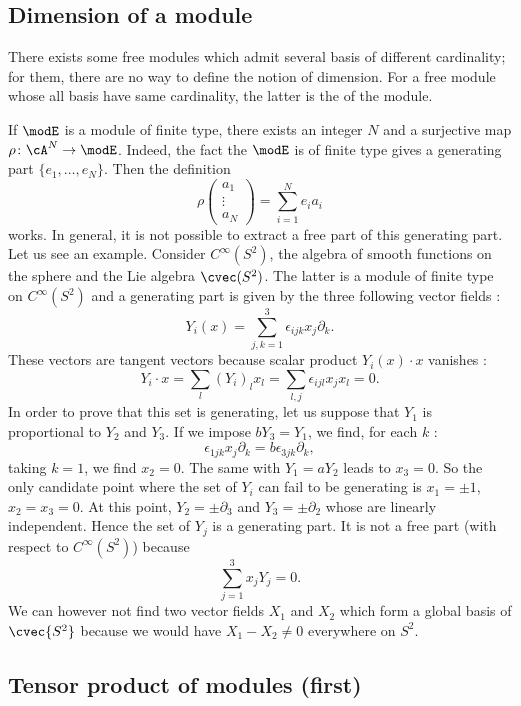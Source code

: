 \subsection{Dimension of a module} \label{subsec_DimofModule}

There exists some free modules which admit several basis of different cardinality; for them, there are no way to define the notion of dimension. For a free module whose all basis have same cardinality, the latter is the  of the module.

If $\modE$ is a module of finite type, there exists an integer $N$ and a surjective map $\rho\colon \cA^N\to \modE$. Indeed, the fact the $\modE$ is of finite type gives a generating part $\{ e_1,\ldots,e_N \}$. Then the definition
\[ 
  \rho
\begin{pmatrix}
a_1\\\vdots\\ a_N
\end{pmatrix}
=
\sum_{i=1}^N e_ia_i
\]
works. In general, it is not possible to extract a free part of this generating part. Let us see an example. Consider $ C^{\infty}(S^2)$, the algebra of smooth functions on the sphere and the Lie algebra $\cvec(S^2)$. The latter is a module of finite type on $ C^{\infty}(S^2)$ and a generating part is given by the three following vector fields :
\[ 
  Y_i(x)=\sum_{j,k=1}^3 \epsilon_{ijk}x_j\partial_k.
\]
These vectors are tangent vectors because scalar product $Y_i(x)\cdot x$ vanishes :
\[ 
  Y_i\cdot x =\sum_l (Y_i)_lx_l=\sum_{l,j}\epsilon_{ijl} x_jx_l=0.
\]
In order to prove that this set is generating, let us suppose that $Y_1$ is proportional to $Y_2$ and $Y_3$. If we impose $bY_3=Y_1$, we find, for each $k$ :
\[ 
  \epsilon_{1jk} x_j\partial_k=b\epsilon_{3jk}\partial_k,
\]
taking $k=1$, we find $x_2=0$. The same with $Y_1=aY_2$ leads to $x_3=0$. So the only candidate point where the set of $Y_i$ can fail to be generating is $x_1=\pm 1$, $x_2=x_3=0$. At this point, $Y_2=\pm\partial_3$ and $Y_3=\pm\partial_2$ whose are linearly independent. Hence the set of $Y_j$ is a generating part. It is not a free part (with respect to $ C^{\infty}(S^2)$) because
\[ 
  \sum_{j=1}^3 x_jY_j=0.
\]
We can however not find two vector fields $X_1$ and $X_2$ which form a global basis of $\cvec{S^2}$ because we would have $X_1-X_2\neq0$ everywhere on $S^2$.

\subsection{Tensor product of modules (first)}

